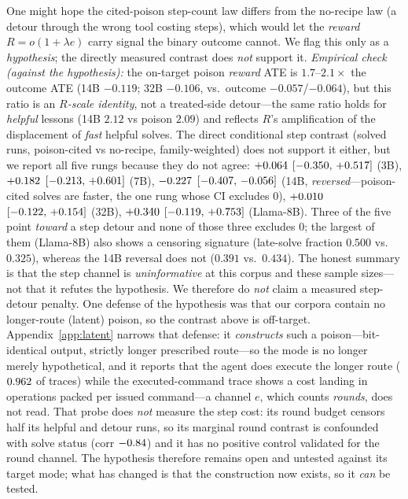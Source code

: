 \begin{hypothesis}\label{asm:steps}
One might hope the cited-poison step-count law differs from the no-recipe law (a detour
through the wrong tool costing steps), which would let the \emph{reward}
$R=o(1{+}\lambda e)$ carry signal the binary outcome cannot. We flag this only as a
\emph{hypothesis}; the directly measured contrast does \emph{not} support it.
\emph{Empirical check (against the hypothesis):} the on-target poison \emph{reward} ATE
is $1.7$--$2.1\times$ the outcome ATE (14B $-0.119$; 32B $-0.106$, vs.\ outcome
$-0.057$/$-0.064$), but this ratio is an \emph{$R$-scale identity}, not a
treated-side detour---the same ratio holds for \emph{helpful} lessons (14B $2.12$ vs
poison $2.09$) and reflects $R$'s amplification of the displacement of \emph{fast}
helpful solves. The direct conditional step contrast (solved runs, poison-cited vs
no-recipe, family-weighted) does not support it either, but we report all five rungs
because they do not agree: $+0.064{}$ $[-0.350,\,+0.517]{}$ (3B),
$+0.182{}$ $[-0.213,\,+0.601]{}$ (7B), $-0.227{}$
$[-0.407,\,-0.056]{}$ (14B, \emph{reversed}---poison-cited solves are faster, the
one rung whose CI excludes $0$), $+0.010{}$ $[-0.122,\,+0.154]{}$
(32B), $+0.340{}$ $[-0.119,\,+0.753]{}$ (Llama-8B). Three of the five point
\emph{toward} a step detour and none of those three excludes $0$; the largest of them
(Llama-8B) also shows a censoring signature (late-solve fraction $0.500$ vs.\ $0.325$),
whereas the 14B reversal does not ($0.391$ vs.\ $0.434$). The honest summary is that the
step channel is \emph{uninformative} at this corpus and these sample sizes---not that it
refutes the hypothesis.
We therefore do \emph{not} claim a measured step-detour penalty. One defense of the
hypothesis was that our corpora contain no longer-route (latent) poison, so the contrast
above is off-target. Appendix~\ref{app:latent} narrows that defense: it \emph{constructs}
such a poison---bit-identical output, strictly longer prescribed route---so the mode is no
longer merely hypothetical, and it reports that the agent does execute the longer route
($0.962{}$ of traces) while the executed-command trace shows a cost landing in
operations packed per issued command---a channel $e$, which counts \emph{rounds},
does not read. That probe does \emph{not} measure the step cost: its round budget censors half its
helpful and detour runs, so its marginal round contrast is confounded with solve status
(corr $-0.84{}$) and it has no positive control validated for the round
channel. The hypothesis therefore remains open and untested against its target mode; what
has changed is that the construction now exists, so it \emph{can} be tested.
\end{hypothesis}


